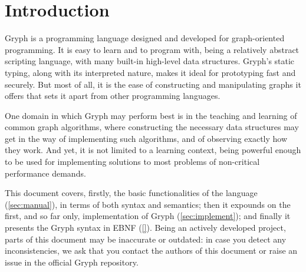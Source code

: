 \section{Introduction}
\label{sec:intro}
Gryph is a programming language designed and developed for graph-oriented programming. It is easy to learn and to program with, being a relatively abstract scripting language, with many built-in high-level data structures. Gryph's static typing, along with its interpreted nature, makes it ideal for prototyping fast and securely. But most of all, it is the ease of constructing and manipulating graphs it offers that sets it apart from other programming languages.

One domain in which Gryph may perform best is in the teaching and learning of common graph algorithms, where constructing the necessary data structures may get in the way of implementing such algorithms, and of observing exactly how they work. And yet, it is not limited to a learning context, being powerful enough to be used for implementing solutions to most problems of non-critical performance demands.

This document covers, firstly, the basic functionalities of the language (\ref{sec:manual}), in terms of both syntax and semantics; then it expounds on the first, and so far only, implementation of Gryph (\ref{sec:implement}); and finally it presents the Gryph syntax in EBNF (\ref{}). Being an actively developed project, parts of this document may be inaccurate or outdated: in case you detect any inconsistencies, we ask that you contact the authors of this document or raise an issue in the official Gryph repository.